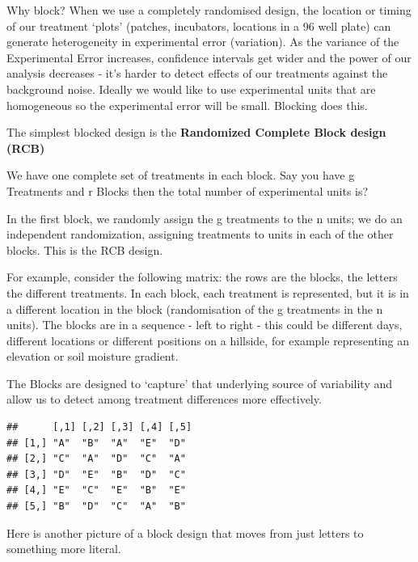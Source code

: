 \documentclass[
]{book}
\begin{document}
Why block? When we use a completely randomised design, the location or timing of our treatment `plots' (patches, incubators, locations in a 96 well plate) can generate heterogeneity in experimental error (variation). As the variance of the Experimental Error increases, confidence intervals get wider and the power of our analysis decreases - it's harder to detect effects of our treatments against the background noise. Ideally we would like to use experimental units that are homogeneous so the experimental error will be small. Blocking does this.

The simplest blocked design is the \textbf{Randomized Complete Block design (RCB)}

We have one complete set of treatments in each block. Say you have g Treatments and r Blocks then the total number of experimental units is?

In the first block, we randomly assign the g treatments to the n units; we do an independent randomization, assigning treatments to units in each of the other blocks. This is the RCB design.

For example, consider the following matrix: the rows are the blocks, the letters the different treatments. In each block, each treatment is represented, but it is in a different location in the block (randomisation of the g treatments in the n units). The blocks are in a sequence - left to right - this could be different days, different locations or different positions on a hillside, for example representing an elevation or soil moisture gradient.

The Blocks are designed to `capture' that underlying source of variability and allow us to detect among treatment differences more effectively.

\begin{verbatim}
##      [,1] [,2] [,3] [,4] [,5]
## [1,] "A"  "B"  "A"  "E"  "D" 
## [2,] "C"  "A"  "D"  "C"  "A" 
## [3,] "D"  "E"  "B"  "D"  "C" 
## [4,] "E"  "C"  "E"  "B"  "E" 
## [5,] "B"  "D"  "C"  "A"  "B"
\end{verbatim}

Here is another picture of a block design that moves from just letters to something more literal.
\end{document}
